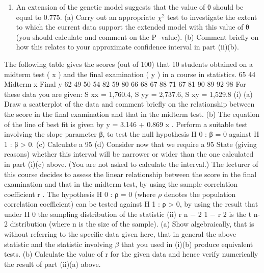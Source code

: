 \documentclass[a4paper,12pt]{article}
\begin{document}
\begin{enumerate}
\begin{enumerate}
(a) Determine the second derivative of the log-likelihood and use this, evaluated at θ̂ = 0.825, to obtain an approximation for the Cramer-Rao lower bound for this situation.
(b) Hence calculate an approximate 95\% confidence interval for $\theta$, using the asymptotic distribution of the MLE.
\item 
An extension of the genetic model suggests that the value of θ should be equal to 0.775.
(a) Carry out an appropriate $\chi^2$ test to investigate the extent to which the current data support the extended model with this value of θ (you should calculate and comment on the P -value).
(b) Comment briefly on how this relates to your approximate confidence interval in part (ii)(b).
\end{enumerate}
The following table gives the scores (out of 100) that 10 students obtained on a midterm test ( x ) and the final examination ( y ) in a course in statistics.
65
44
Midterm x
Final y
62
49
50
54
82
59
80
66
68
67
88
71
67
81
90
89
92
98
For these data you are given: S xx = 1,760.4, S yy = 2,737.6, S xy = 1,529.8
(i)
(a) Draw a scatterplot of the data and comment briefly on the relationship between the score in the final examination and that in the midterm test.
(b) The equation of the line of best fit is given by y = 3.146 + 0.869 x . Perform a suitable test involving the slope parameter β, to test the null hypothesis H 0 : β = 0 against H 1 : β > 0.
(c) Calculate a 95%
(d) Consider now that we require a 95%
State (giving reasons) whether this interval will be narrower or wider than the one calculated in part (i)(c) above. (You are not asked to calculate the interval.)
The lecturer of this course decides to assess the linear relationship between the score in the final examination and that in the midterm test, by using the sample correlation coefficient r .
The hypothesis H 0 : ρ = 0 (where $\rho$ denotes the population correlation coefficient) can be tested against H 1 : ρ > 0, by using the result that under H 0 the sampling distribution
of the statistic
(ii)
r n − 2
1 − r 2
is the t n-2 distribution (where n is the size of the sample).
(a) Show algebraically, that is without referring to the specific data given here, that in general the above statistic and the statistic involving $\beta$ that you used in (i)(b) produce equivalent tests.
(b) Calculate the value of r for the given data and hence verify numerically the result of part (ii)(a) above.
\newpage


\end{enumerate}
\end{document}
